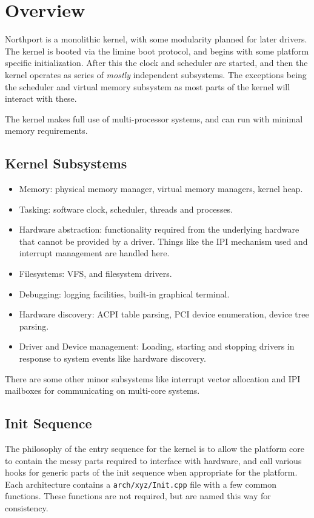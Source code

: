 \section{Overview}
Northport is a monolithic kernel, with some modularity planned for later drivers. The kernel is booted via the limine boot protocol, and begins with some platform specific initialization. After this the clock and scheduler are started, and then the kernel operates as series of \textit{mostly} independent subsystems. The exceptions being the scheduler and virtual memory subsystem as most parts of the kernel will interact with these.

The kernel makes full use of multi-processor systems, and can run with minimal memory requirements.

\subsection{Kernel Subsystems}
\begin{itemize}
    \item Memory: physical memory manager, virtual memory managers, kernel heap.
    \item Tasking: software clock, scheduler, threads and processes.
    \item Hardware abstraction: functionality required from the underlying hardware that cannot be provided by a driver. Things like the IPI mechanism used and interrupt management are handled here.
    \item Filesystems: VFS, and filesystem drivers.
    \item Debugging: logging facilities, built-in graphical terminal.
    \item Hardware discovery: ACPI table parsing, PCI device enumeration, device tree parsing.
    \item Driver and Device management: Loading, starting and stopping drivers in response to system events like hardware discovery.
\end{itemize}

There are some other minor subsystems like interrupt vector allocation and IPI mailboxes for communicating on multi-core systems.

\subsection{Init Sequence}
The philosophy of the entry sequence for the kernel is to allow the platform core to contain the messy parts required to interface with hardware, and call various hooks for generic parts of the init sequence when appropriate for the platform. Each architecture contains a \verb|arch/xyz/Init.cpp| file with a few common functions. These functions are not required, but are named this way for consistency.


